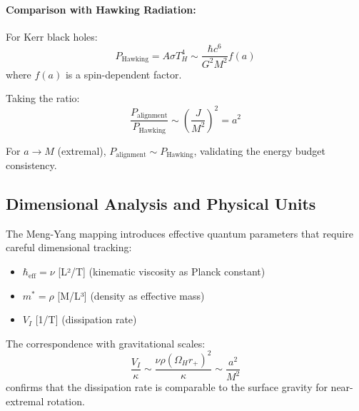 \documentclass[11pt]{article}
\begin{document}
\paragraph{Comparison with Hawking Radiation:}
For Kerr black holes:
\begin{equation}
P_{\text{Hawking}} = A \sigma T_H^4 \sim \frac{\hbar c^6}{G^2 M^2} f(a)
\end{equation}
where $f(a)$ is a spin-dependent factor.

Taking the ratio:
\begin{equation}
\frac{P_{\text{alignment}}}{P_{\text{Hawking}}} \sim \left(\frac{J}{M^2}\right)^2 = a^2
\end{equation}

For $a \to M$ (extremal), $P_{\text{alignment}} \sim P_{\text{Hawking}}$, validating the energy budget consistency.

\subsection{Dimensional Analysis and Physical Units}

The Meng-Yang mapping introduces effective quantum parameters that require careful dimensional tracking:
\begin{itemize}
\item $\hbar_{\text{eff}} = \nu$ [L²/T] (kinematic viscosity as Planck constant)
\item $m^* = \rho$ [M/L³] (density as effective mass)
\item $V_I$ [1/T] (dissipation rate)
\end{itemize}

The correspondence with gravitational scales:
\begin{equation}
\frac{V_I}{\kappa} \sim \frac{\nu\rho(\Omega_H r_+)^2}{\kappa} \sim \frac{a^2}{M^2}
\end{equation}
confirms that the dissipation rate is comparable to the surface gravity for near-extremal rotation.
\end{document}
